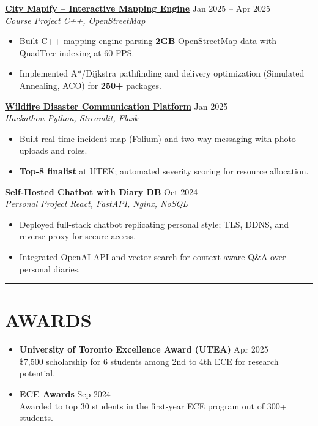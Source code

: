 \documentclass[letterpaper,10pt]{article}
\begin{document}
\vspace{0.15cm}
\noindent\href{https://github.com/Ken-2511/city-mapify}{\uline{\textbf{City Mapify – Interactive Mapping Engine}}} \hfill Jan 2025 -- Apr 2025\\
\textit{Course Project \textbar{} C++, OpenStreetMap}
\begin{itemize}
	\item Built C++ mapping engine parsing \textbf{2GB} OpenStreetMap data with QuadTree indexing at 60 FPS.
	\item Implemented A*/Dijkstra pathfinding and delivery optimization (Simulated Annealing, ACO) for \textbf{250+} packages.
\end{itemize}

\vspace{0.15cm}
\noindent\href{https://github.com/Ken-2511/utek_disaster_communication_system}{\uline{\textbf{Wildfire Disaster Communication Platform}}} \hfill Jan 2025\\
\textit{Hackathon \textbar{} Python, Streamlit, Flask}
\begin{itemize}
    \item Built real-time incident map (Folium) and two-way messaging with photo uploads and roles.
    \item \textbf{Top-8 finalist} at UTEK; automated severity scoring for resource allocation.
\end{itemize}

\vspace{0.15cm}
\noindent\href{https://chengyongkang.me/chat}{\uline{\textbf{Self-Hosted Chatbot with Diary DB}}} \hfill Oct 2024\\
\textit{Personal Project \textbar{} React, FastAPI, Nginx, NoSQL}
\begin{itemize}
    \item Deployed full-stack chatbot replicating personal style; TLS, DDNS, and reverse proxy for secure access.
    \item Integrated OpenAI API and vector search for context-aware Q\&A over personal diaries.
\end{itemize}

\noindent\rule{\linewidth}{1pt}

\section*{\textbf{AWARDS}}

\begin{itemize}[leftmargin=0.2in]
	\item \textbf{University of Toronto Excellence Award (UTEA)} \hfill Apr 2025\\
    \$7,500 scholarship for 6 students among 2nd to 4th ECE for research potential.
	\item \textbf{ECE Awards} \hfill Sep 2024\\
	Awarded to top 30 students in the first-year ECE program out of 300+ students.
\end{itemize}
\end{document}
